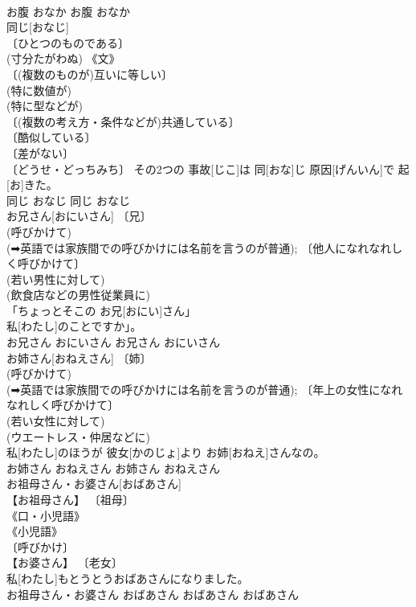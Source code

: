 \documentclass[8pt]{extreport}
\begin{document}
\begin{CJK}{UTF8}{min}
\\	お腹	おなか	お腹	おなか	
\\	同じ[おなじ]	
\\	〔ひとつのものである〕 
\\	(寸分たがわぬ) 《文》 
\\	〔(複数のものが)互いに等しい〕 
\\	(特に数値が) 
\\	(特に型などが) 
\\	〔(複数の考え方・条件などが)共通している〕 
\\	〔酷似している〕 
\\	〔差がない〕 
\\	〔どうせ・どっちみち〕	その2つの 事故[じこ]は 同[おな]じ 原因[げんいん]で 起[お]きた。	
\\	同じ	おなじ	同じ	おなじ	
\\	お兄さん[おにいさん]	〔兄〕 
\\	(呼びかけて) 
\\	(➡英語では家族間での呼びかけには名前を言うのが普通); 〔他人になれなれしく呼びかけて〕 
\\	(若い男性に対して) 
\\	(飲食店などの男性従業員に) 
\\	「ちょっとそこの お兄[おにい]さん」
\\	私[わたし]のことですか」。	
\\	お兄さん	おにいさん	お兄さん	おにいさん	
\\	お姉さん[おねえさん]	〔姉〕 
\\	(呼びかけて) 
\\	(➡英語では家族間での呼びかけには名前を言うのが普通); 〔年上の女性になれなれしく呼びかけて〕 
\\	(若い女性に対して) 
\\	(ウエートレス・仲居などに) 
\\	私[わたし]のほうが 彼女[かのじょ]より お姉[おねえ]さんなの。	
\\	お姉さん	おねえさん	お姉さん	おねえさん	
\\	お祖母さん・お婆さん[おばあさん]	
\\	【お祖母さん】 〔祖母〕 
\\	《口・小児語》 
\\	《小児語》 
\\	〔呼びかけ〕 
\\	【お婆さん】 〔老女〕 
\\	私[わたし]もとうとうおばあさんになりました。	
\\	お祖母さん・お婆さん	おばあさん	おばあさん	おばあさん	

\end{CJK}
\end{document}
